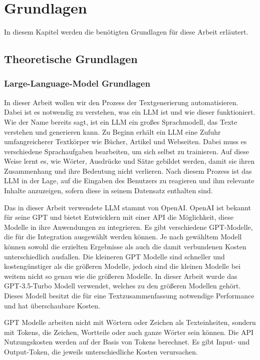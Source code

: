 \chapter{Grundlagen}
In diesem Kapitel werden die benötigten Grundlagen für diese Arbeit erläutert.

\section{Theoretische Grundlagen}

\subsection{Large-Language-Model Grundlagen}

In dieser Arbeit wollen wir den Prozess der Textgenerierung automatisieren. Dabei ist es notwendig zu verstehen, was ein \ac{LLM} ist und wie dieser funktioniert. Wie der Name bereits sagt, ist ein \ac{LLM} ein großes Sprachmodell, das Texte verstehen und generieren kann. Zu Beginn erhält ein \ac{LLM} eine Zufuhr umfangreicherer Textkörper wie Bücher, Artikel und Webseiten. Dabei muss es verschiedene Sprachaufgaben bearbeiten, um sich selbst zu trainieren. Auf diese Weise lernt es, wie Wörter, Ausdrücke und Sätze gebildet werden, damit sie ihren Zusammenhang und ihre Bedeutung nicht verlieren. Nach diesem Prozess ist das \ac{LLM} in der Lage, auf die Eingaben des Benutzers zu reagieren und ihm relevante Inhalte anzuzeigen, sofern diese in seinem Datensatz enthalten sind. \cite[S.1]{kumar2024ethics}

Das in dieser Arbeit verwendete \ac{LLM} stammt von OpenAI. OpenAI ist bekannt für seine \ac{GPT} und bietet Entwicklern mit einer \ac{API} die Möglichkeit, diese Modelle in ihre Anwendungen zu integrieren. Es gibt verschiedene \ac{GPT}-Modelle, die für die Integration ausgewählt werden können. Je nach gewähltem Modell können sowohl die erzielten Ergebnisse als auch die damit verbundenen Kosten unterschiedlich ausfallen. Die kleineren \ac{GPT} Modelle sind schneller und kostengünstiger als die größeren Modelle, jedoch sind die kleinen Modelle bei weitem nicht so genau wie die größeren Modelle. In dieser Arbeit wurde das \ac{GPT}-3.5-Turbo Modell verwendet, welches zu den größeren Modellen gehört. Dieses Modell besitzt die für eine Textzusammenfassung notwendige Performance und hat überschaubare Kosten. \cite{openai_quickstart}

\ac{GPT} Modelle arbeiten nicht mit Wörtern oder Zeichen als Texteinheiten, sondern mit Tokens, die Zeichen, Wortteile oder auch ganze Wörter sein können. Die \ac{API} Nutzungskosten werden auf der Basis von Tokens berechnet. Es gibt Input- und Output-Token, die jeweils unterschiedliche Kosten verursachen. \cite{openai_pricing}


